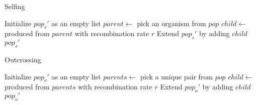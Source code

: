 \documentclass[12pt]{article}
\begin{document}
\begin{algorithm}
  \caption{Selfing}
  \label{algo:selfing}
  \begin{algorithmic}
    \State Initialize \(pop_{s}'\) as an empty list
    \State \(parent \gets\) pick an organism from \(pop\)
    \State \(child \gets\) produced from \(parent\) with recombination
    rate \(r\)
    \State Extend \(pop_{s}'\) by adding \(child\)
    \EndFor
    \State \Return \(pop_{s}'\)
    \EndFunction
  \end{algorithmic}
\end{algorithm}

\begin{algorithm}
  \caption{Outcrossing}
  \label{algo:outcrossing}
  \begin{algorithmic}
    \State Initialize \(pop_{o}'\) as an empty list
    \State \(parents \gets\) pick a unique pair from \(pop\)
    \State \(child \gets\) produced from \(parents\) with
    recombination rate \(r\)
    \State Extend \(pop_{o}'\) by adding \(child\)
    \EndFor
    \State \Return \(pop_{o}'\)
    \EndFunction
  \end{algorithmic}
\end{algorithm}
\end{document}
